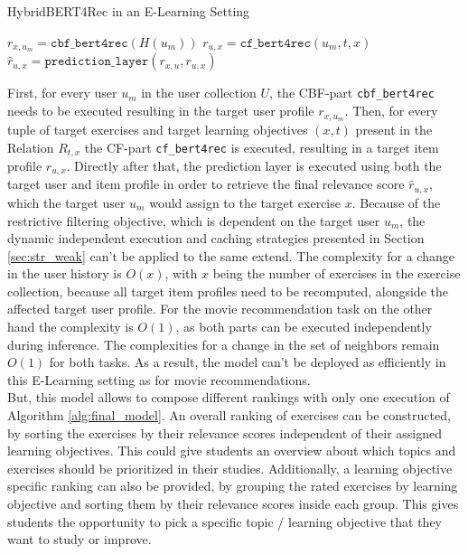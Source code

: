 \documentclass{Academic}
\begin{document}
        \begin{algorithm}[ht!]
            \caption{HybridBERT4Rec in an E-Learning Setting}
            \label{alg:final_model}
            \begin{algorithmic}[1]
                    \State $r_{x,u_m} = \texttt{cbf\_bert4rec}(H(u_m))$
                        \State $r_{u, x} = \texttt{cf\_bert4rec}(u_m,t,x)$
                        \State $\hat{r}_{u,x} = \texttt{prediction\_layer}(r_{x,u}, r_{u,x})$
                    \EndFor
                \EndFor
            \end{algorithmic}
        \end{algorithm}
        First, for every user $u_m$ in the user collection $U$, the CBF-part \texttt{cbf\_bert4rec} needs to be executed resulting in the target user profile $r_{x,u_m}$. Then, for every tuple of target exercises and target learning objectives $(x,t)$ present in the Relation $R_{t,x}$ the CF-part \texttt{cf\_bert4rec} is executed, resulting in a target item profile $r_{u,x}$. Directly after that, the prediction layer is executed using both the target user and item profile in order to retrieve the final relevance score $\hat{r}_{u,x}$, which the target user $u_m$ would assign to the target exercise $x$. Because of the restrictive filtering objective, which is dependent on the target user $u_m$, the dynamic independent execution and caching strategies presented in Section \ref{sec:str_weak} can't be applied to the same extend. The complexity for a change in the user history is $O(x)$, with $x$ being the number of exercises in the exercise collection, because all target item profiles need to be recomputed, alongside the affected target user profile. For the movie recommendation task on the other hand the complexity is $O(1)$, as both parts can be executed independently during inference. The complexities for a change in the set of neighbors remain $O(1)$ for both tasks. As a result, the model can't be deployed as efficiently in this E-Learning setting as for movie recommendations.\\
        But, this model allows to compose different rankings with only one execution of Algorithm \ref{alg:final_model}. An overall ranking of exercises can be constructed, by sorting the exercises by their relevance scores independent of their assigned learning objectives. This could give students an overview about which topics and exercises should be prioritized in their studies. Additionally, a learning objective specific ranking can also be provided, by grouping the rated exercises by learning objective and sorting them by their relevance scores inside each group. This gives students the opportunity to pick a specific topic / learning objective that they want to study or improve.
\end{document}

